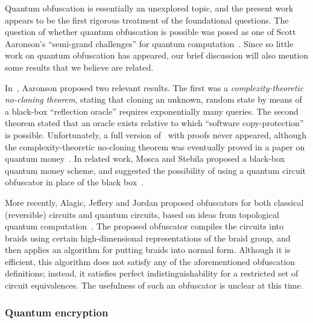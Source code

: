 \documentclass[11pt]{article}
\numberwithin{equation}{section}
\begin{document}
{Quantum obfuscation is essentially an unexplored topic, and the present work appears to be the first rigorous treatment of the foundational questions. The question of whether quantum obfuscation is possible was posed as one of Scott Aaronson's ``semi-grand challenges'' for quantum computation~\cite{Aar05}. Since so little work on quantum obfuscation has appeared, our brief discussion will also mention some results that we believe are related. 

In~\cite{Aar09}, Aaronson proposed two relevant results. The first was a \emph{complexity-theoretic no-cloning theorem}, stating that cloning an unknown, random state by means of a black-box ``reflection oracle'' requires exponentially many queries. The second theorem stated that an oracle exists relative to which ``software copy-protection'' is possible. Unfortunately, a full version of~\cite{Aar09} with proofs never appeared, although the complexity-theoretic no-cloning theorem was eventually proved in a paper on quantum money~\cite{AC12}. In related work, Mosca and Stebila proposed a black-box quantum money scheme, and suggested the possibility of using a quantum circuit obfuscator in place of the black box~\cite{MS10}.

More recently, Alagic, Jeffery and Jordan proposed obfuscators for both classical (reversible) circuits and quantum circuits, based on ideas from topological quantum computation~\cite{AJJ14}. The proposed obfuscator compiles the circuits into braids using certain high-dimensional representations of the braid group, and then applies an algorithm for putting braids into normal form. Although it is efficient, this algorithm does not satisfy any of the aforementioned obfuscation definitions; instead, it satisfies perfect indistinguishability for a restricted set of circuit equivalences. The usefulness of such an obfuscator is unclear at this time.

\subsubsection{Quantum encryption}

}
\end{document}
